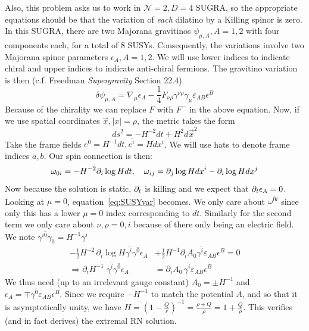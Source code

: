 \documentclass[11pt, class=article, crop=false]{standalone}
\begin{document}
\begin{enumerate}
	Also, this problem asks us to work in $\mathcal N =2, D = 4$ SUGRA, so the appropriate equations should be that the variation of \emph{each} dilatino by a Killing spinor is zero. In this SUGRA, there are two Majorana gravitinos $
\psi_{\mu, A}, A=1,2$ with four components each, for a total of $8$ SUSYs. Consequently, the variations involve two Majorana spinor parameters $\epsilon_{A}, A=1,2$. We will use lower indices to indicate chiral and upper indices to indicate anti-chiral fermions. The gravitino variation is then (c.f. Freedman \emph{Supergravity} Section 22.4)
\begin{equation}\label{eq:SUSYvar}
		\delta \psi_{\mu, A} = \nabla_\mu \epsilon_A - \frac14 F_{\nu \rho} \gamma^{\nu \rho} \gamma_\mu \varepsilon_{AB} \epsilon^B
\end{equation}
	Because of the chirality we can replace $F$ with $F^-$ in the above equation. Now, if we use spatial coordinates $\vec x, |x| = \rho$, the metric takes the form
	\[
		ds^2 = -H^{-2} dt + H^2 d\vec x^2 
	\]
	Take the frame fields $e^{\hat 0} = H^{-1} dt, e^{\hat i} = H dx^i$. We will use hats to denote frame indices $a,b$. Our spin connection is then:
	\[
		\omega_{0i} = - H^{-2} \partial_i \log H dt, \quad \omega_{ij} = \partial_j \log H dx^i -\partial_i \log H dx^j
	\]
	Now because the solution is static, $\partial_t$ is killing and we expect that $\partial_t \epsilon_A = 0$. Looking at $\mu = 0$, equation~\eqref{eq:SUSYvar} becomes. We only care about $\omega^{\hat 0 \hat i}$ since only this has a lower $\mu = 0$ index corresponding to $dt$. Similarly for the second term we only care about $\nu,\rho = 0,i$ because of there only being an electric field. We note $\gamma^{i \hat 0} \gamma_{0} = H^{-1} \gamma^i$
	\[
	\begin{aligned}
		-\frac12 H^{-2} \, \partial_i \log H \gamma^{\hat i} \gamma^{\hat 0} \epsilon_A &+ \frac12 H^{-1} \partial_i A_0 \gamma^{\hat i} \varepsilon_{AB} \epsilon^B = 0\\
		 \Rightarrow \partial_i H^{-1} \; \gamma^{\hat i} \gamma^{\hat 0} \epsilon_A &= \partial_i A_0 \, \gamma^{\hat i} \varepsilon_{AB} \epsilon^B
	\end{aligned}
	\]
	We thus need (up to an irrelevant gauge constant) $A_0 = \pm H^{-1}$ and $\epsilon_A = \mp \gamma^{\hat 0} \varepsilon_{AB} \epsilon^B$. Since we require $-H^{-1}$ to match the potential $A$, and so that it is asymptotically unity, we have $H = (1 - \frac{Q}{r})^{-1} = \frac{\rho+Q}{\rho} = 1 + \frac{Q}{\rho}$. This verifies (and in fact derives) the extremal RN solution. 
	

\end{enumerate}
\end{document}
